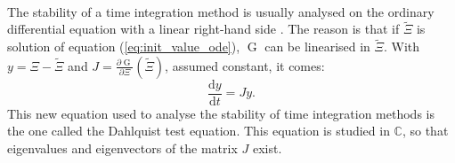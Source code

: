         \paragraph{}
        The stability of a time integration method is usually analysed on the ordinary differential equation with a linear right-hand side \cite{HairerWanner1996}.
        The reason is that if $\tilde{\Xi}$ is solution of equation (\ref{eq:init_value_ode}), $\operatorname{G}$ can be linearised in $\tilde{\Xi}$.
        With $y = \Xi - \tilde{\Xi}$ and $J = \frac{\partial \operatorname{G}}{\partial \Xi}\left(\tilde{\Xi}\right)$, assumed constant, it comes:
        \begin{equation}\label{eq:dahlquist}
          \frac{\mathrm{d} y}{\mathrm{d} t} = J y .
        \end{equation}
        This new equation used to analyse the stability of time integration methods is the one called the Dahlquist test equation.
        This equation is studied in $\mathbb{C}$, so that eigenvalues and eigenvectors of the matrix $J$ exist.

